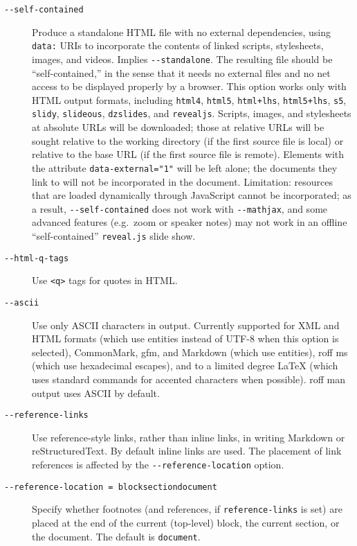 \documentclass[
]{article}
\begin{document}
\begin{description}
\item[\texttt{-\/-self-contained}]
Produce a standalone HTML file with no external dependencies, using
\texttt{data:} URIs to incorporate the contents of linked scripts,
stylesheets, images, and videos. Implies \texttt{-\/-standalone}. The
resulting file should be ``self-contained,'' in the sense that it needs
no external files and no net access to be displayed properly by a
browser. This option works only with HTML output formats, including
\texttt{html4}, \texttt{html5}, \texttt{html+lhs}, \texttt{html5+lhs},
\texttt{s5}, \texttt{slidy}, \texttt{slideous}, \texttt{dzslides}, and
\texttt{revealjs}. Scripts, images, and stylesheets at absolute URLs
will be downloaded; those at relative URLs will be sought relative to
the working directory (if the first source file is local) or relative to
the base URL (if the first source file is remote). Elements with the
attribute \texttt{data-external="1"} will be left alone; the documents
they link to will not be incorporated in the document. Limitation:
resources that are loaded dynamically through JavaScript cannot be
incorporated; as a result, \texttt{-\/-self-contained} does not work
with \texttt{-\/-mathjax}, and some advanced features (e.g.~zoom or
speaker notes) may not work in an offline ``self-contained''
\texttt{reveal.js} slide show.
\item[\texttt{-\/-html-q-tags}]
Use \texttt{\textless{}q\textgreater{}} tags for quotes in HTML.
\item[\texttt{-\/-ascii}]
Use only ASCII characters in output. Currently supported for XML and
HTML formats (which use entities instead of UTF-8 when this option is
selected), CommonMark, gfm, and Markdown (which use entities), roff ms
(which use hexadecimal escapes), and to a limited degree LaTeX (which
uses standard commands for accented characters when possible). roff man
output uses ASCII by default.
\item[\texttt{-\/-reference-links}]
Use reference-style links, rather than inline links, in writing Markdown
or reStructuredText. By default inline links are used. The placement of
link references is affected by the \texttt{-\/-reference-location}
option.
\item[\texttt{-\/-reference-location\ =\ block}\textbar{}\texttt{section}\textbar{}\texttt{document}]
Specify whether footnotes (and references, if \texttt{reference-links}
is set) are placed at the end of the current (top-level) block, the
current section, or the document. The default is \texttt{document}.

\end{description}
\end{document}
